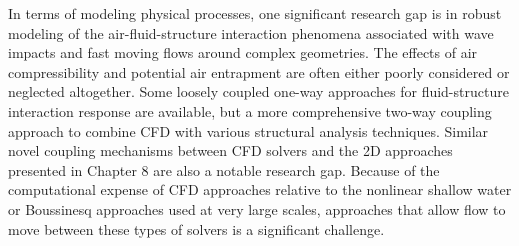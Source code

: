 In terms of modeling physical processes, one significant research gap is in robust modeling of the air-fluid-structure interaction phenomena associated with wave impacts and fast moving flows around complex geometries.  The effects of air compressibility and potential air entrapment are often either poorly considered or neglected altogether.  Some loosely coupled one-way approaches for fluid-structure interaction response are available, but a more comprehensive two-way coupling approach to combine CFD with various structural analysis techniques.  Similar novel coupling mechanisms between CFD solvers and the 2D approaches presented in Chapter 8 are also a notable research gap.  Because of the computational expense of CFD approaches relative to the nonlinear shallow water or Boussinesq approaches used at very large scales, approaches that allow flow to move between these types of solvers is a significant challenge.
